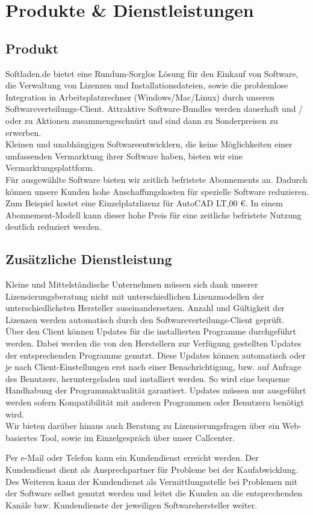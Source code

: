 \chapter{Produkte \& Dienstleistungen}
\section{Produkt}
Softladen.de bietet eine Rundum-Sorglos Lösung für den Einkauf von Software, die Verwaltung von Lizenzen und Installationsdateien, sowie die problemlose Integration in Arbeitsplatzrechner (Windows/Mac/Linux) durch unseren Softwareverteilungs-Client. Attraktive Software-Bundles werden dauerhaft und / oder zu Aktionen zusammengeschnürt und sind dann zu Sonderpreisen zu erwerben.\\

Kleinen und unabhängigen Softwareentwicklern, die keine Möglichkeiten einer umfassenden Vermarktung ihrer Software haben, bieten wir eine Vermarktungsplattform.\\ 

Für ausgewählte Software bieten wir zeitlich befristete Abonnements an. Dadurch können unsere Kunden hohe Anschaffungskosten für spezielle Software reduzieren. Zum Beispiel kostet eine Einzelplatzlizenz für AutoCAD LT,00 €. In einem Abonnement-Modell kann dieser hohe Preis für eine zeitliche befristete Nutzung deutlich reduziert werden.  \\ 

\section{Zusätzliche Dienstleistung}
Kleine und Mittelständische Unternehmen müssen sich dank unserer Lizensierungsberatung nicht mit unterschiedlichen Lizenzmodellen der unterschiedlichsten Hersteller auseinandersetzen. Anzahl und Gültigkeit der Lizenzen werden automatisch durch den Softwareverteilungs-Client geprüft.\\

Über den Client können Updates für die installierten Programme durchgeführt werden. Dabei werden die von den Herstellern zur Verfügung gestellten Updates der entsprechenden Programme genutzt. Diese Updates können automatisch oder je nach Client-Einstellungen erst nach einer Benachrichtigung, bzw. auf Anfrage des Benutzers, heruntergeladen und installiert werden. So wird eine bequeme Handhabung der Programmaktualität garantiert. Updates müssen nur ausgeführt werden sofern Kompatibilität mit anderen Programmen oder Benutzern benötigt wird. \\

Wir bieten darüber hinaus auch Beratung zu Lizensierungsfragen über ein Web-basiertes Tool, sowie im Einzelgespräch über unser Callcenter.\\ 

Per e-Mail oder Telefon kann ein Kundendienst erreicht werden. Der Kundendienst dient als Ansprechpartner für Probleme bei der Kaufabwicklung. Des Weiteren kann der Kundendienst als Vermittlungsstelle bei Problemen mit der Software selbst genutzt werden und leitet die Kunden an die entsprechenden Kanäle bzw.  Kundendienste der jeweiligen Softwarehersteller weiter. \\
